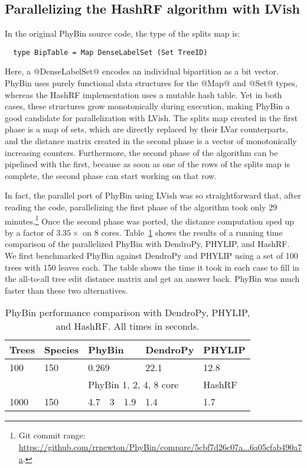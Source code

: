 \subsection{Parallelizing the HashRF algorithm with LVish}

In the original PhyBin source code, the type of the splits map is:

\singlespacing
\begin{lstlisting}
  type BipTable = Map DenseLabelSet (Set TreeID)
\end{lstlisting}
\doublespacing

Here, a @DenseLabelSet@ encodes an individual bipartition as a bit
vector.  PhyBin uses purely functional data structures for the @Map@
and @Set@ types, whereas the HashRF implementation uses a mutable hash
table.  Yet in both cases, these structures grow monotonically during
execution, making PhyBin a good candidate for parallelization with
LVish.  The splits map created in the first phase is a map of sets,
which are directly replaced by their LVar counterparts, and the
distance matrix created in the second phase is a vector of
monotonically increasing counters.  Furthermore, the second phase of
the algorithm can be pipelined with the first, because as soon as one
of the rows of the splits map is complete, the second phase can start
working on that row.

In fact, the parallel port of PhyBin using LVish was so
straightforward that, after reading the code, parallelizing the first
phase of the algorithm took only 29 minutes.\footnote{Git commit
  range:
  \url{https://github.com/rrnewton/PhyBin/compare/5cbf7d26c07a...6a05cfab490a7a}.}
Once the second phase was ported, the distance computation sped up by
a factor of $3.35\times$ on 8 cores. Table~\ref{t:phybin-bench} shows
the results of a running time comparison of the parallelized PhyBin
with DendroPy, PHYLIP, and HashRF.  We first benchmarked PhyBin
against DendroPy and PHYLIP using a set of 100 trees with 150 leaves
each.  The table shows the time it took in each case to fill in the
all-to-all tree edit distance matrix and get an answer back.  PhyBin
was much faster than these two alternatives.

\begin{table}
\begin{tabular}{| l | l | l | l | l | l | l |}
\hline
Trees     & Species    & \multicolumn{3}{|l|}{PhyBin} & DendroPy & PHYLIP \\ \hline
100       & 150        & \multicolumn{3}{|l|}{0.269}  & 22.1     & 12.8   \\ \hline
          &            & \multicolumn{4}{|l|}{PhyBin 1, 2, 4, 8 core} & HashRF \\ \hline
1000      & 150        & 4.7      & 3     & 1.9     & 1.4      & 1.7      \\ \hline
\end{tabular}
\caption{PhyBin performance comparison with DendroPy, PHYLIP, and
  HashRF.  All times in seconds.}
\label{t:phybin-bench}
\end{table}

